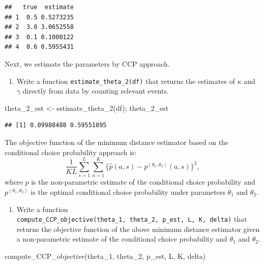 \documentclass[
]{book}
\newenvironment{Shaded}{\begin{snugshade}}{\end{snugshade}}
\newcommand{\FunctionTok}[1]{\textcolor[rgb]{0.00,0.00,0.00}{#1}}
\newcommand{\NormalTok}[1]{#1}
\newcommand{\OtherTok}[1]{\textcolor[rgb]{0.56,0.35,0.01}{#1}}
\providecommand{\tightlist}{%
  \setlength{\itemsep}{0pt}\setlength{\parskip}{0pt}}
\begin{document}
\begin{verbatim}
##   true  estimate
## 1  0.5 0.5273235
## 2  3.0 3.0652558
## 3  0.1 0.1000122
## 4  0.6 0.5955431
\end{verbatim}

Next, we estimate the parameters by CCP approach.

\begin{enumerate}
\def\labelenumi{\arabic{enumi}.}
\setcounter{enumi}{4}
\tightlist
\item
  Write a function \texttt{estimate\_theta\_2(df)} that returns the estimates of \(\kappa\) and \(\gamma\) directly from data by counting relevant events.
\end{enumerate}

\begin{Shaded}
\begin{Highlighting}[]
\NormalTok{theta\_2\_est }\OtherTok{\textless{}{-}} \FunctionTok{estimate\_theta\_2}\NormalTok{(df); theta\_2\_est}
\end{Highlighting}
\end{Shaded}

\begin{verbatim}
## [1] 0.09988488 0.59551895
\end{verbatim}

The objective function of the minimum distance estimator based on the conditional choice probability approach is:
\[
\frac{1}{KL}\sum_{s = 1}^L \sum_{a = 1}^K\{\hat{p}(a, s) - p^{(\theta_1, \theta_2)}(a, s)\}^2,
\]
where \(\hat{p}\) is the non-parametric estimate of the conditional choice probability and \(p^{(\theta_1, \theta_2)}\) is the optimal conditional choice probability under parameters \(\theta_1\) and \(\theta_2\).

\begin{enumerate}
\def\labelenumi{\arabic{enumi}.}
\setcounter{enumi}{5}
\tightlist
\item
  Write a function \texttt{compute\_CCP\_objective(theta\_1,\ theta\_2,\ p\_est,\ L,\ K,\ delta)} that returns the objective function of the above minimum distance estimator given a non-parametric estimate of the conditional choice probability and \(\theta_1\) and \(\theta_2\).
\end{enumerate}

\begin{Shaded}
\begin{Highlighting}[]
\FunctionTok{compute\_CCP\_objective}\NormalTok{(theta\_1, theta\_2, p\_est, L, K, delta)}
\end{Highlighting}
\end{Shaded}
\end{document}
